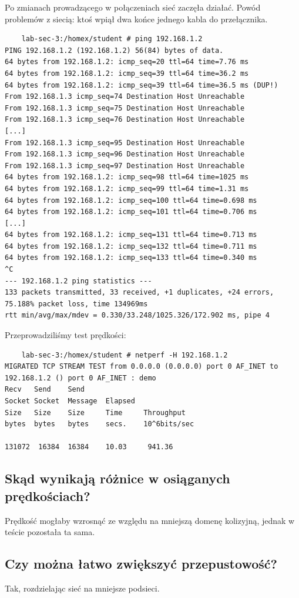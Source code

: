 \documentclass[polish, a4paper]{article}
\begin{document}
Po zmianach prowadzącego w połączeniach sieć zaczęła działać.
Powód problemów z siecią: ktoś wpiął dwa końce jednego kabla do przełącznika.
\begin{verbatim}
    lab-sec-3:/homex/student # ping 192.168.1.2
PING 192.168.1.2 (192.168.1.2) 56(84) bytes of data.
64 bytes from 192.168.1.2: icmp_seq=20 ttl=64 time=7.76 ms
64 bytes from 192.168.1.2: icmp_seq=39 ttl=64 time=36.2 ms
64 bytes from 192.168.1.2: icmp_seq=39 ttl=64 time=36.5 ms (DUP!)
From 192.168.1.3 icmp_seq=74 Destination Host Unreachable
From 192.168.1.3 icmp_seq=75 Destination Host Unreachable
From 192.168.1.3 icmp_seq=76 Destination Host Unreachable
[...]
From 192.168.1.3 icmp_seq=95 Destination Host Unreachable
From 192.168.1.3 icmp_seq=96 Destination Host Unreachable
From 192.168.1.3 icmp_seq=97 Destination Host Unreachable
64 bytes from 192.168.1.2: icmp_seq=98 ttl=64 time=1025 ms
64 bytes from 192.168.1.2: icmp_seq=99 ttl=64 time=1.31 ms
64 bytes from 192.168.1.2: icmp_seq=100 ttl=64 time=0.698 ms
64 bytes from 192.168.1.2: icmp_seq=101 ttl=64 time=0.706 ms
[...]
64 bytes from 192.168.1.2: icmp_seq=131 ttl=64 time=0.713 ms
64 bytes from 192.168.1.2: icmp_seq=132 ttl=64 time=0.711 ms
64 bytes from 192.168.1.2: icmp_seq=133 ttl=64 time=0.340 ms
^C
--- 192.168.1.2 ping statistics ---
133 packets transmitted, 33 received, +1 duplicates, +24 errors, 75.188% packet loss, time 134969ms
rtt min/avg/max/mdev = 0.330/33.248/1025.326/172.902 ms, pipe 4
\end{verbatim}

Przeprowadziliśmy test prędkości:
\begin{verbatim}
    lab-sec-3:/homex/student # netperf -H 192.168.1.2
MIGRATED TCP STREAM TEST from 0.0.0.0 (0.0.0.0) port 0 AF_INET to 192.168.1.2 () port 0 AF_INET : demo
Recv   Send    Send                          
Socket Socket  Message  Elapsed              
Size   Size    Size     Time     Throughput  
bytes  bytes   bytes    secs.    10^6bits/sec  

131072  16384  16384    10.03     941.36   
\end{verbatim}


\subsection{Skąd wynikają różnice w osiąganych prędkościach?}
Prędkość mogłaby wzrosnąć ze względu na mniejszą domenę kolizyjną, jednak w teście pozostała ta sama.

\subsection{Czy można łatwo zwiększyć przepustowość?}
Tak, rozdzielając sieć na mniejsze podsieci.
\end{document}
